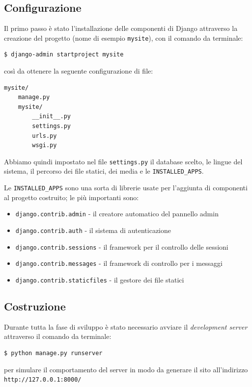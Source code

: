 \subsection{Configurazione}
\label{subs:config}
Il primo passo è stato l'installazione delle componenti di Django attraverso la creazione del progetto (nome di esempio \texttt{mysite}), con il comando da terminale:
\begin{verbatim}
$ django-admin startproject mysite
\end{verbatim}

così da ottenere la seguente configurazione di file:
\begin{small}
\begin{verbatim}
mysite/
    manage.py
    mysite/
        __init__.py
        settings.py
        urls.py
        wsgi.py
\end{verbatim}
\end{small}

Abbiamo quindi impostato nel file \texttt{settings.py} il database scelto, le lingue del sistema, il percorso dei file statici, dei media e le \texttt{INSTALLED\_APPS}.

Le \texttt{INSTALLED\_APPS} sono una sorta di librerie usate per l'aggiunta di componenti al progetto costruito; le più importanti sono:
\begin{itemize}
 \item \texttt{django.contrib.admin} - il creatore automatico del pannello admin
 \item \texttt{django.contrib.auth} - il sistema di autenticazione
 \item \texttt{django.contrib.sessions} - il framework per il controllo delle sessioni
 \item \texttt{django.contrib.messages} - il framework di controllo per i messaggi
 \item \texttt{django.contrib.staticfiles} - il gestore dei file statici
\end{itemize}

\subsection{Costruzione}
\label{subs:crea}
Durante tutta la fase di sviluppo è stato necessario avviare il \emph{development server} attraverso il comando da terminale:
\begin{verbatim}
$ python manage.py runserver
\end{verbatim}
per simulare il comportamento del server in modo da generare il sito all'indirizzo \texttt{http://127.0.0.1:8000/}

